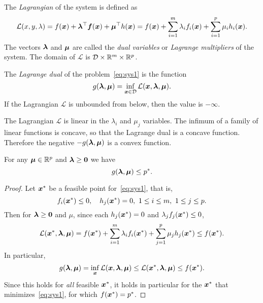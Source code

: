 The {\em Lagrangian} of the system is defined as
\begin{equation*}
 \mathcal{L}(x,y,\lambda) = f(\bm{x})+\bm{\lambda}^{\top}\bm{f}(\bm{x})+\bm{\mu}^{\top}h(\bm{x}) = f(\bm{x}) +\sum_{i=1}^m \lambda_i f_i(\bm{x})+\sum_{i=1}^p \mu_i h_i(\bm{x}).
\end{equation*}
The vectors $\bm{\lambda}$ and $\bm{\mu}$ are called the {\em dual variables} or {\em Lagrange multipliers} of the system. The domain of $\mathcal{L}$ is $\mathcal{D}\times \mathbb{R}^m\times \mathbb{R}^{p}$. 

\begin{definition}
 The {\em Lagrange dual} of the problem~\eqref{eq:sys1} is the function
 \begin{equation*}
  g(\bm{\lambda},\bm{\mu}) = \inf_{\bm{x}\in \mathcal{D}} \mathcal{L}(\bm{x},\bm{\lambda},\bm{\mu}).
 \end{equation*}
If the Lagrangian $\mathcal{L}$ is unbounded from below, then the value is $-\infty$.
\end{definition}

The Lagrangian $\mathcal{L}$ is linear in the $\lambda_i$ and $\mu_j$ variables. The infimum of a family of linear functions is concave, so that the Lagrange dual is a concave function. Therefore the negative $-g(\bm{\lambda},\bm{\mu})$ is a convex function.

\begin{lemma}\label{le:lag1}
 For any $\bm{\mu}\in \mathbb{R}^{p}$ and $\bm{\lambda}\geq \bm{0}$ we have
 \begin{equation*}
 g(\bm{\lambda},\bm{\mu})\leq p^*.
 \end{equation*}
\end{lemma}

\begin{proof}
 Let $\bm{x}^*$ be a feasible point for~\eqref{eq:sys1}, that is,
 \begin{equation*}
  f_i(\vct{x}^*)\leq 0, \quad h_j(\vct{x}^*)=0,\ 1\leq i\leq m, \ 1\leq j\leq p.
 \end{equation*}
Then for $\bm{\lambda}\geq \bm{0}$ and $\mu$, since each $h_j(\bm{x}^*)=0$ and $\lambda_jf_j(\bm{x}^*)\leq 0$, 
\begin{equation*}
 \mathcal{L}(\bm{x}^*,\bm{\lambda},\bm{\mu}) = f(\bm{x}^*)+\sum_{i=1}^m \lambda_if_i(\bm{x}^*)+\sum_{j=1}^p \mu_j h_j(\bm{x}^*)\leq f(\bm{x}^*).
\end{equation*}
In particular,
\begin{equation*}
 g(\bm{\lambda},\bm{\mu}) = \inf_{\bm{x}} \mathcal{L}(\bm{x},\bm{\lambda},\bm{\mu}) \leq \mathcal{L}(\bm{x}^*,\bm{\lambda},\bm{\mu}) \leq f(\bm{x}^*).
\end{equation*}
Since this holds for {\em all} feasible $\bm{x}^*$, it holds in particular for the $\bm{x}^*$ that minimizes~\eqref{eq:sys1}, for which $f(\bm{x}^*)=p^*$. 
\end{proof}


